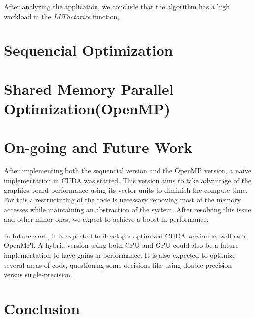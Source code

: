 \documentclass[a4paper,10pt,openright,openbib,twocolumn]{article}
\begin{document}
After analyzing the application, we conclude that the algorithm has a high workload in the \emph{LUFactorize} function,


\section{Sequencial Optimization}


\section{Shared Memory Parallel Optimization(OpenMP)}


\section{On-going and Future Work}    %

After implementing both the sequencial version and the OpenMP version, a na\"{i}ve implementation in CUDA was started. This version aims to take advantage of the graphics board performance using its vector units to diminish the compute time. For this a restructuring of the code is necessary removing most of the memory accesses while maintaining an abstraction of the system. After resolving this issue and other minor ones, we expect to achieve a boost in performance.

In future work, it is expected to develop a optimized CUDA version as well as a OpenMPI. A hybrid version using both CPU and GPU could also be a future implementation to have gains in performance. It is also expected to optimize several areas of code, questioning some decisions like using double-precision versus single-precision. 

\section{Conclusion}

\end{document}
